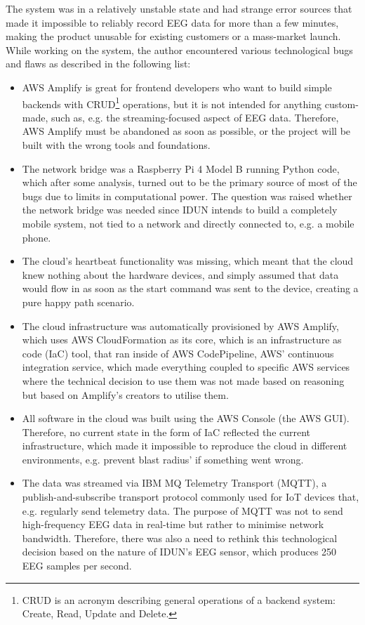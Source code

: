 The system was in a relatively unstable state and had strange error sources that made it impossible to reliably record EEG data for more than a few minutes, making the product unusable for existing customers or a mass-market launch. While working on the system, the author encountered various technological bugs and flaws as described in the following list:

\begin{itemize}

\item AWS Amplify is great for frontend developers who want to build simple backends with CRUD\footnote{CRUD is an acronym describing general operations of a backend system: Create, Read, Update and Delete.} operations, but it is not intended for anything custom-made, such as, e.g. the streaming-focused aspect of EEG data. Therefore, AWS Amplify must be abandoned as soon as possible, or the project will be built with the wrong tools and foundations.
\item The network bridge was a Raspberry Pi 4 Model B running Python code, which after some analysis, turned out to be the primary source of most of the bugs due to limits in computational power. The question was raised whether the network bridge was needed since IDUN intends to build a completely mobile system, not tied to a network and directly connected to, e.g. a mobile phone.
\item The cloud's heartbeat functionality was missing, which meant that the cloud knew nothing about the hardware devices, and simply assumed that data would flow in as soon as the start command was sent to the device, creating a pure happy path scenario.
\item The cloud infrastructure was automatically provisioned by AWS Amplify, which uses AWS CloudFormation as its core, which is an infrastructure as code (IaC) tool, that ran inside of AWS CodePipeline, AWS' continuous integration service, which made everything coupled to specific AWS services where the technical decision to use them was not made based on reasoning but based on Amplify's creators to utilise them.
\item All software in the cloud was built using the AWS Console (the AWS GUI). Therefore, no current state in the form of IaC reflected the current infrastructure, which made it impossible to reproduce the cloud in different environments, e.g. prevent blast radius' if something went wrong.
\item The data was streamed via IBM MQ Telemetry Transport (MQTT), a publish-and-subscribe transport protocol commonly used for IoT devices that, e.g. regularly send telemetry data. The purpose of MQTT was not to send high-frequency EEG data in real-time but rather to minimise network bandwidth. Therefore, there was also a need to rethink this technological decision based on the nature of IDUN's EEG sensor, which produces 250 EEG samples per second.

\end{itemize}
